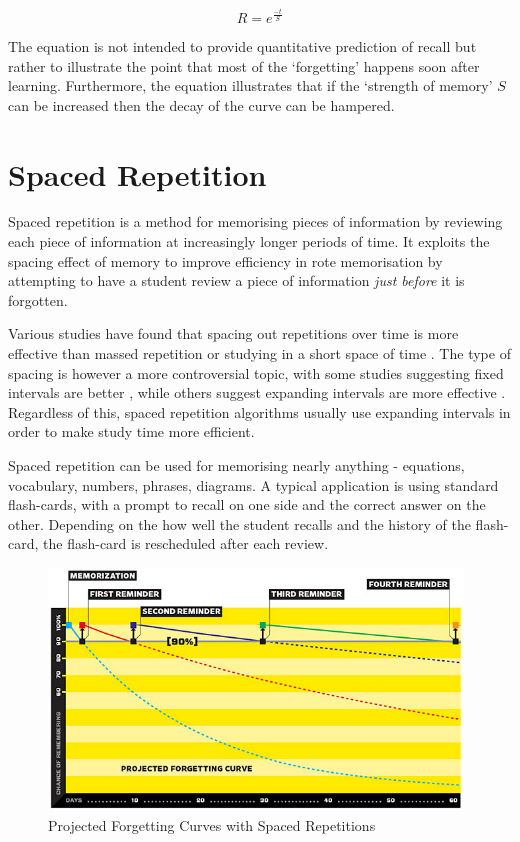 \begin{equation}
\label{eqn_forgetcurve}
R = e^{\frac{-t}{S}}
\end{equation}

The equation
is not intended to provide quantitative prediction of recall but rather to illustrate
the point that most of the `forgetting' happens soon after learning. Furthermore,
the equation illustrates that if the `strength of memory' $S$ can
be increased then the decay of the curve can be hampered.



\section{Spaced Repetition} \label{background_spacedrepetition}
Spaced repetition is a method for memorising pieces of information by reviewing
each piece of information at increasingly longer periods of time. It exploits the 
spacing effect of memory to improve efficiency in rote memorisation by attempting to 
have a student review a piece of
information \textit{just before} it is forgotten. 

Various studies have found that spacing out repetitions over time is
more effective than massed repetition or studying in a short space of time \cite{distributed_massed_2005}.
The type of spacing is however a more controversial topic, with some studies suggesting
fixed intervals are better \cite{fixed_intervals_2005}, while others suggest expanding intervals
are more effective \cite{effects_of_spacing_1963}. Regardless of this, spaced
repetition algorithms usually use expanding intervals in order to make study
time more efficient.

Spaced repetition can be used for memorising
nearly anything - equations, vocabulary, numbers, phrases, diagrams. A typical application
is using standard flash-cards, with a prompt to recall on one side and the correct answer on
the other. Depending on the how well the student recalls and the history of the flash-card, the
flash-card is rescheduled after each review. 

\begin{figure}[h!]
\includegraphics[width=11cm]{img/wired_forgetcurve.jpg}
\caption{Projected Forgetting Curves with Spaced Repetitions \cite{wolf_want_2008}}
\label{fig_projectedforgettingcurve}
\end{figure}

